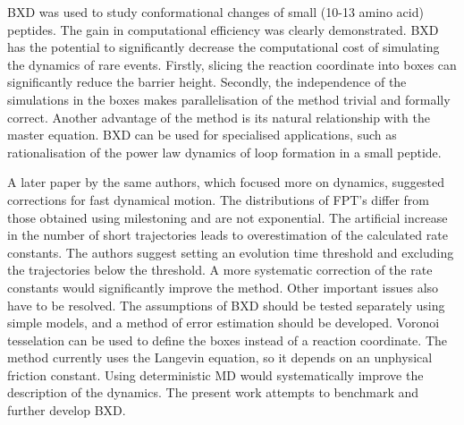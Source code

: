 BXD was used to study conformational changes of small (10-13 amino acid) peptides.\cite{Glowacki2009}
The gain in computational efficiency was clearly demonstrated.
BXD has the potential to significantly decrease the computational cost of simulating the dynamics of rare events.
Firstly, slicing the reaction coordinate into boxes can significantly reduce the barrier height. 
Secondly, the independence of the simulations in the boxes makes parallelisation of the method trivial and formally correct.
Another advantage of the method is its natural relationship with the master equation.
BXD can be used for specialised applications, such as rationalisation of the power law dynamics of loop formation in a small peptide.\cite{Shalashilin2012}


A later paper\cite{Glowacki2011} by the same authors, which focused more on dynamics, suggested corrections for fast dynamical motion.
The distributions of FPT's differ from those obtained using milestoning and are not exponential.
The artificial increase in the number of short trajectories leads to overestimation of the calculated rate constants.
The authors suggest setting an evolution time threshold and excluding the trajectories below the threshold.
A more systematic correction of the rate constants would significantly improve the method.
Other important issues also have to be resolved.
The assumptions of BXD should be tested separately using simple models, and a method of error estimation should be developed.
Voronoi tesselation can be used to define the boxes instead of a reaction coordinate.\cite{Glowacki2011}
The method currently uses the Langevin equation, so it depends on an unphysical friction constant.
Using deterministic MD would systematically improve the description of the dynamics.
The present work attempts to benchmark and further develop BXD.

